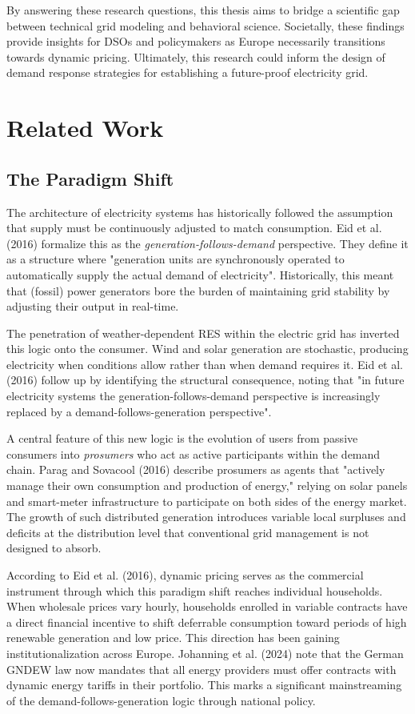 \documentclass[11pt, a4paper]{article}
\begin{document}
By answering these research questions, this thesis aims to bridge a scientific gap between technical grid modeling and behavioral science. Societally, these findings provide insights for DSOs and policymakers as Europe necessarily transitions towards dynamic pricing. Ultimately, this research could inform the design of demand response strategies for establishing a future-proof electricity grid.

\section{Related Work}

\subsection{The Paradigm Shift} \label{subs:shift}
The architecture of electricity systems has historically followed the assumption that supply must be continuously adjusted to match consumption. Eid et al. (2016) formalize this as the \textit{generation-follows-demand} perspective. They define it as a structure where "generation units are synchronously operated to automatically supply the actual demand of electricity". Historically, this meant that (fossil) power generators bore the burden of maintaining grid stability by adjusting their output in real-time.

The penetration of weather-dependent RES within the electric grid has inverted this logic onto the consumer. Wind and solar generation are stochastic, producing electricity when conditions allow rather than when demand requires it. Eid et al. (2016) follow up by identifying the structural consequence, noting that "in future electricity systems the generation-follows-demand perspective is increasingly replaced by a demand-follows-generation perspective".  

A central feature of this new logic is the evolution of users from passive consumers into \textit{prosumers} who act as active participants within the demand chain. Parag and Sovacool (2016) describe prosumers as agents that "actively manage their own consumption and production of energy," relying on solar panels and smart-meter infrastructure to participate on both sides of the energy market. The growth of such distributed generation introduces variable local surpluses and deficits at the distribution level that conventional grid management is not designed to absorb.

According to Eid et al. (2016), dynamic pricing serves as the commercial instrument through which this paradigm shift reaches individual households. When wholesale prices vary hourly, households enrolled in variable contracts have a direct financial incentive to shift deferrable consumption toward periods of high renewable generation and low price. This direction has been gaining institutionalization across Europe. Johanning et al. (2024) note that the German GNDEW law now mandates that all energy providers must offer contracts with dynamic energy tariffs in their portfolio. This marks a significant mainstreaming of the demand-follows-generation logic through national policy. 
\end{document}
